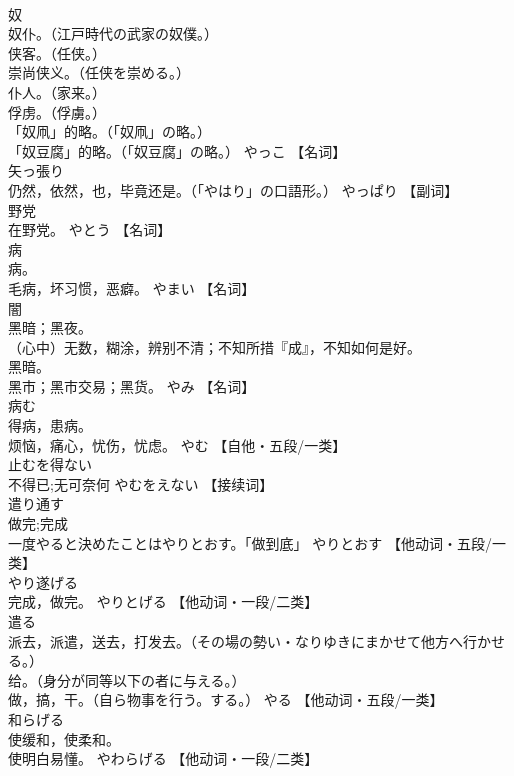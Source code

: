 \documentclass[8pt]{extreport}
\begin{document}
\begin{CJK}{UTF8}{min}
\\	奴	
\\	奴仆。（江戸時代の武家の奴僕。） 
\\	侠客。（任侠。） 
\\	崇尚侠义。（任侠を崇める。） 
\\	仆人。（家来。） 
\\	俘虏。（俘虜。） 
\\	「奴凧」的略。（「奴凧」の略。） 
\\	「奴豆腐」的略。（「奴豆腐」の略。）	やっこ		【名词】
\\	矢っ張り	
\\	仍然，依然，也，毕竟还是。（「やはり」の口語形。）	やっぱり		【副词】
\\	野党	
\\	在野党。	やとう		【名词】
\\	病	
\\	病。 
\\	毛病，坏习惯，恶癖。	やまい		【名词】
\\	闇	
\\	黑暗；黑夜。 
\\	（心中）无数，糊涂，辨别不清；不知所措『成』，不知如何是好。 
\\	黑暗。 
\\	黑市；黑市交易；黑货。	やみ		【名词】
\\	病む	
\\	得病，患病。 
\\	烦恼，痛心，忧伤，忧虑。	やむ		【自他・五段/一类】
\\	止むを得ない	
\\	不得已;无可奈何	やむをえない		【接续词】
\\	遣り通す	
\\	做完;完成 
\\	一度やると決めたことはやりとおす。「做到底」	やりとおす		【他动词・五段/一类】
\\	やり遂げる	
\\	完成，做完。	やりとげる		【他动词・一段/二类】
\\	遣る	
\\	派去，派遣，送去，打发去。（その場の勢い・なりゆきにまかせて他方へ行かせる。） 
\\	给。（身分が同等以下の者に与える。） 
\\	做，搞，干。（自ら物事を行う。する。）	やる		【他动词・五段/一类】
\\	和らげる	
\\	使缓和，使柔和。 
\\	使明白易懂。	やわらげる		【他动词・一段/二类】

\end{CJK}
\end{document}
